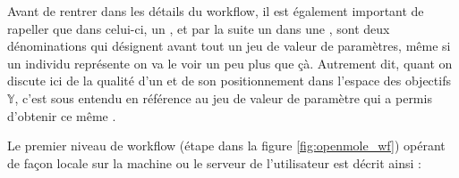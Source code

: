 Avant de rentrer dans les détails du workflow, il est également important de rapeller que dans celui-ci, un , et par la suite un  dans une , sont deux dénominations qui désignent avant tout un jeu de valeur de paramètres, même si un individu représente on va le voir un peu plus que çà. Autrement dit, quant on discute ici de la qualité d'un  et de son positionnement dans l'espace des objectifs $\mathbb{Y}$, c'est sous entendu en référence au jeu de valeur de paramètre qui a permis d'obtenir ce même .

Le premier niveau de workflow (étape  dans la figure \ref{fig:openmole_wf}) opérant de façon locale sur la machine ou le serveur de l'utilisateur est décrit ainsi :


